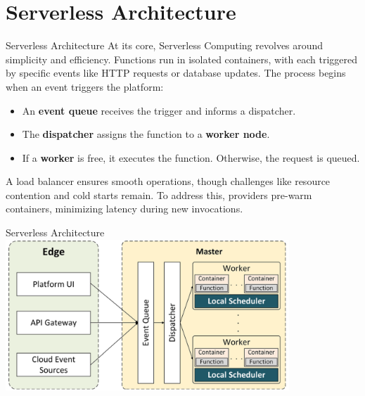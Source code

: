 \documentclass[aspectratio=169]{beamer}
\begin{document}
\section{Serverless Architecture}
\begin{frame}{Serverless Architecture}
At its core, Serverless Computing revolves around simplicity and efficiency. Functions run in isolated containers, with each triggered by specific events like HTTP requests or database updates.
The process begins when an event triggers the platform:
\begin{itemize}
    \item An \textbf{event queue} receives the trigger and informs a dispatcher.
    \item The \textbf{dispatcher} assigns the function to a \textbf{worker node}.
    \item If a \textbf{worker} is free, it executes the function. Otherwise, the request is queued.
\end{itemize}
A load balancer ensures smooth operations, though challenges like resource contention and cold starts remain. To address this, providers pre-warm containers, minimizing latency during new invocations.    
\end{frame}

\begin{frame}{Serverless Architecture}
\centering
\includegraphics[width=0.8\textwidth]{img/arch.png}
\end{frame}

\end{document}
